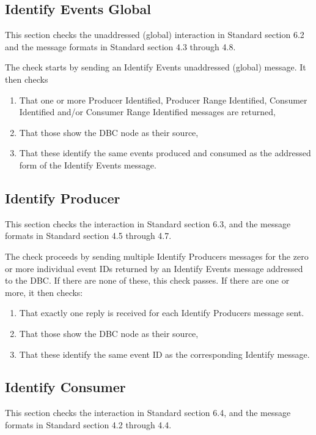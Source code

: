 \documentclass[11pt]{article}
\begin{document}
\subsection{Identify Events Global}

This section checks the unaddressed (global) interaction in Standard section 6.2 and
the message formats in Standard section 4.3 through 4.8.

The check starts by sending an Identify Events unaddressed (global) message.
It then checks

\begin{enumerate}
\item That one or more Producer Identified, Producer Range Identified, 
        Consumer Identified and/or Consumer Range Identified messages are returned,
\item That those show the DBC node as their source,
\item That these identify the same events produced and consumed as the 
        addressed form of the Identify Events message.
\end{enumerate}

\subsection{Identify Producer}

This section checks the interaction in Standard section 6.3, and
the message formats in Standard section 4.5 through 4.7.

The check proceeds by sending multiple Identify Producers messages for 
the zero or more individual event IDs returned by an Identify Events message 
addressed to the DBC. If there are none of these, this check passes. If there
are one or more, it then checks:

\begin{enumerate}
\item That exactly one reply is received for each Identify Producers message sent.
\item That those show the DBC node as their source,
\item That these identify the same event ID as the corresponding Identify message.
\end{enumerate}

\subsection{Identify Consumer}

This section checks the interaction in Standard section 6.4, and
the message formats in Standard section 4.2 through 4.4.
\end{document}

